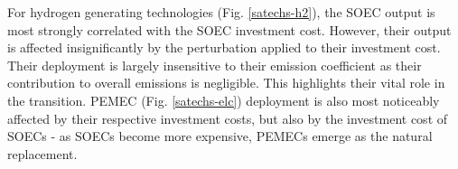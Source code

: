 For hydrogen generating technologies (Fig. \ref{satechs-h2}), the \gls{SOEC} output is most strongly correlated with the SOEC investment cost. However, their output is affected insignificantly by the perturbation applied to their investment cost. Their deployment is largely insensitive to their emission coefficient as their contribution to overall emissions is negligible. This highlights their vital role in the transition. \gls{PEMEC} (Fig. \ref{satechs-elc}) deployment is also most noticeably affected by their respective investment costs, but also by the investment cost of SOECs - as SOECs become more expensive, \gls{PEMEC}s emerge as the natural replacement.
